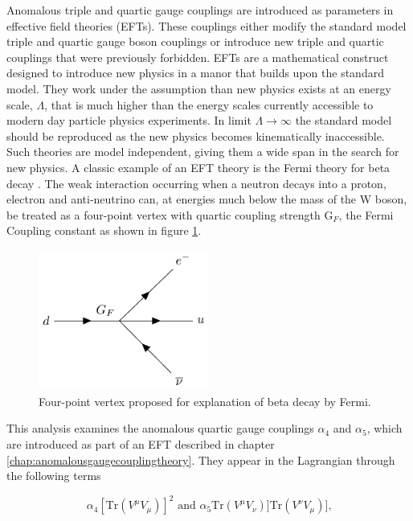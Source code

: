 Anomalous triple and quartic gauge couplings are introduced as parameters in effective field theories (EFTs).  These couplings either modify the standard model triple and quartic gauge boson couplings or introduce new triple and quartic couplings that were previously forbidden.  EFTs are a mathematical construct designed to introduce new physics in a manor that builds upon the standard model.  They work under the assumption than new physics exists at an energy scale, $\Lambda$, that is much higher than the energy scales currently accessible to modern day particle physics experiments.  In limit $\Lambda \rightarrow \infty$ the standard model should be reproduced as the new physics becomes kinematically inaccessible.  Such theories are model independent, giving them a wide span in the search for new physics.  A classic example of an EFT theory is the Fermi theory for beta decay \cite{Fermi:1934hr}.  The weak interaction occurring when a neutron decays into a proton, electron and anti-neutrino can, at energies much below the mass of the W boson, be treated as a four-point vertex with quartic coupling strength $\text{G}_{F}$, the Fermi Coupling constant as shown in figure \ref{fig:fermitheory}.

\begin{figure}[h!]
\includegraphics[width=0.5\textwidth]{PhysicsAnalysis/Plots/FeynmanDiagrams/FermiTheory.pdf}
\caption[Four-point vertex proposed for explanation of beta decay by Fermi.]{Four-point vertex proposed for explanation of beta decay by Fermi.} 
\label{fig:fermitheory}
\end{figure}

This analysis examines the anomalous quartic gauge couplings $\alpha_{4}$ and $\alpha_{5}$, which are introduced as part of an EFT described in chapter \ref{chap:anomalousgaugecouplingtheory}.  They appear in the Lagrangian through the following terms 

\begin{equation}
\alpha_{4}[\text{Tr}(V^{\mu}V_{\mu})]^{2} \text{ and } \alpha_{5}\text{Tr}(V^{\mu}V_{\nu})] \text{Tr}(V^{\nu}V_{\mu})]\text{,}
\end{equation}

